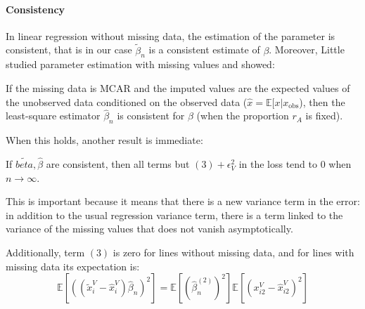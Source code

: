 


\paragraph{Consistency}
In linear regression without missing data, the estimation of the parameter is consistent\cite{consistency_linreg}, that is in our case $\tilde{\beta}_n$ is a consistent estimate of $\beta$. Moreover, Little \cite{little1992missingX} studied parameter estimation with missing values and showed:

\begin{proposition}
\label{prop.consistency}
If the missing data is MCAR and the imputed values are the expected values of the unobserved data conditioned on the observed data ($\hat{x} = \mathbb{E}[x \vert x_{\text{obs}}$), then the least-square estimator $\hat{\beta}_n$ is consistent for $\beta$ (when the proportion $r_A$ is fixed).
\end{proposition}

When this holds, another result is immediate:
\begin{proposition}
\label{prop.error}
If $\tilde{beta}, \hat{\beta}$ are consistent, then all terms but $(3) + \epsilon_V^2$ in the loss tend to 0 when $n\rightarrow \infty$. 
\end{proposition}

This is important because it means that there is a new variance term in the error: in addition to the usual regression variance term, there is a term linked to the variance of the missing values that does not vanish asymptotically.

 Additionally, term $(3)$ is zero for lines without missing data, and for lines with missing data its expectation is:
$$ \mathbb{E}[((\tilde{x}_i^V - \hat{x}_i^V) \hat{\beta}_n)^2] = \mathbb{E}[(\hat{\beta}_n^{(2)})^2] \mathbb{E}[(x_{i2}^V - \hat{x}_{i2}^V)^2] $$


